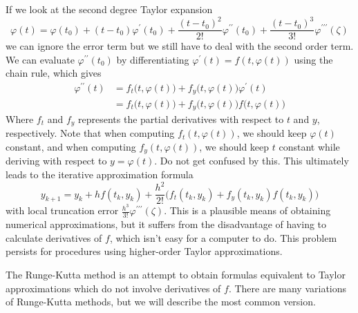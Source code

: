 \documentclass{article}
\theoremstyle{remark}
\theoremstyle{definition}
\begin{document}
If we look at the second degree Taylor expansion 
\[\varphi(t) = \varphi(t_0) + (t - t_0) \varphi^\prime (t_0) + \frac{(t - t_0)^2}{2!} \varphi^{\prime\prime} (t_0) + \frac{(t - t_0)^3}{3!} \varphi^{\prime\prime\prime} (\zeta)\]
we can ignore the error term but we still have to deal with the second order term. We can evaluate $\varphi^{\prime\prime} (t_0)$ by differentiating $\varphi^\prime (t) = f(t, \varphi(t))$ using the chain rule, which gives
\begin{align*}
    \varphi^{\prime\prime} (t) & = f_t \big( t, \varphi(t)\big) + f_y \big(t, \varphi(t)\big) \varphi^\prime (t) \\
    & = f_t \big(t, \varphi(t)\big) + f_y \big( t, \varphi(t)\big) f\big(t, \varphi(t)\big)
\end{align*}
Where $f_t$ and $f_y$ represents the partial derivatives with respect to $t$ and $y$, respectively. Note that when computing $f_t (t, \varphi(t))$, we should keep $\varphi(t)$ constant, and when computing $f_y (t, \varphi(t))$, we should keep $t$ constant while deriving with respect to $y = \varphi(t)$. Do not get confused by this. This ultimately leads to the iterative approximation formula
\[y_{k+1} = y_k + h f(t_k, y_k) + \frac{h^2}{2!} \big( f_t (t_k, y_k) + f_y (t_k, y_k) f(t_k, y_k)\big)\]
with local truncation error $\frac{h^3}{3!} \varphi^{\prime\prime\prime} (\zeta)$. This is a plausible means of obtaining numerical approximations, but it suffers from the disadvantage of having to calculate derivatives of $f$, which isn't easy for a computer to do. This problem persists for procedures using higher-order Taylor approximations. 

The Runge-Kutta method is an attempt to obtain formulas equivalent to Taylor approximations which do not involve derivatives of $f$. There are many variations of Runge-Kutta methods, but we will describe the most common version. 
\end{document}
